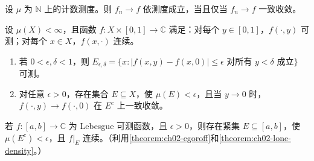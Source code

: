 \documentclass[../../main.tex]{subfiles}%
\begin{document}
\begin{exercise}\label{exercise:ch02-counting-uniform}
设 $\mu$ 为 $\mathbb{N}$ 上的计数测度。则 $f_n\to f$ 依测度成立，当且仅当 $f_n\to f$ 一致收敛。
\end{exercise}
\begin{exercise}\label{exercise:ch02-parameter-almost-uniform}
设 $\mu(X)<\infty$，且函数 $f:X\times[0,1]\to\mathbb{C}$ 满足：对每个 $y\in[0,1]$，$f(\cdot,y)$ 可测；对每个 $x\in X$，$f(x,\cdot)$ 连续。
\begin{enumerate}
\item\label{item:ch02-parameter-tail-measurable} 若 $0<\epsilon,\delta<1$，则 $E_{\epsilon,\delta}=\{x:|f(x,y)-f(x,0)|\le\epsilon\text{ 对所有 }y<\delta\text{ 成立}\}$ 可测。
\item\label{item:ch02-parameter-tail-uniform} 对任意 $\epsilon>0$，存在集合 $E\subseteq X$，使 $\mu(E)<\epsilon$，且当 $y\to0$ 时，$f(\cdot,y)\to f(\cdot,0)$ 在 $E^c$ 上一致收敛。
\end{enumerate}
\end{exercise}
\begin{exercise}[Lusin 定理]\label{exercise:ch02-lusin}
若 $f:[a,b]\to\mathbb{C}$ 为 Lebesgue 可测函数，且 $\epsilon>0$，则存在紧集 $E\subseteq[a,b]$，使 $\mu(E^c)<\epsilon$，且 $f|_E$ 连续。（利用\cref{theorem:ch02-egoroff}和\cref{theorem:ch02-lone-density}。）
\end{exercise}
\end{document}
